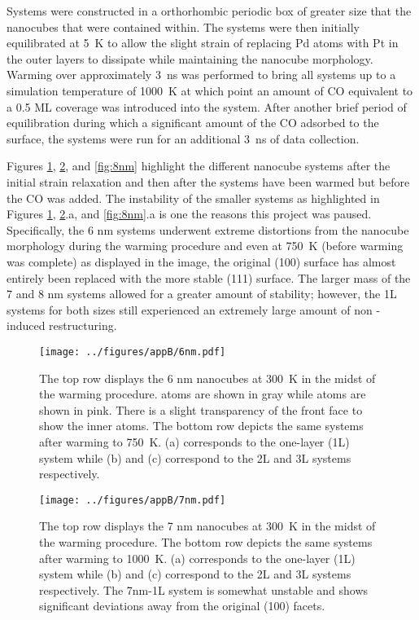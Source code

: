 {Systems were constructed in a orthorhombic periodic box of greater size that
the nanocubes that were contained within. The systems were then initially
equilibrated at 5~K to allow the slight strain of replacing Pd atoms with Pt in
the outer layers to dissipate while maintaining the nanocube morphology.
Warming over approximately 3~ns was performed to bring all systems up to a
simulation temperature of 1000~K at which point an amount of CO equivalent to a
0.5 ML coverage was introduced into the system.  After another brief period of
equilibration during which a significant amount of the CO adsorbed to the
surface, the systems were run for an additional 3~ns of
data collection.

Figures \ref{fig:6nm}, \ref{fig:7nm}, and \ref{fig:8nm} highlight the different
nanocube systems after the initial strain relaxation and then after the systems
have been warmed but before the CO was added. The instability of the smaller
systems as highlighted in Figures \ref{fig:6nm}, \ref{fig:7nm}.a, and
\ref{fig:8nm}.a is one the reasons this project was paused.  Specifically, the
6 nm systems underwent extreme distortions from the nanocube morphology during
the warming procedure and even at 750~K (before warming was complete) as
displayed in the image, the original (100) surface has almost entirely been
replaced with the more stable (111) surface. The larger mass of the 7 and 8 nm
systems allowed for a greater amount of stability; however, the 1L systems for
both sizes still experienced an extremely large amount of non -induced
restructuring.

\begin{landscape}
\begin{figure}[p!]
\centering
  \texttt{[image: ../figures/appB/6nm.pdf]}
  \caption{The top row displays the 6 nm nanocubes at 300~K in the midst of the
warming procedure.   atoms are shown in gray while  atoms are
shown in pink.  There is a slight transparency of the front  face to
show the inner  atoms. The bottom row depicts the same systems after
warming to 750~K.  (a) corresponds to the one-layer (1L) system while (b) and
(c) correspond to the 2L and 3L systems respectively.}
  \label{fig:6nm}
\end{figure}
\end{landscape}

\begin{landscape}
\begin{figure}[p!]
\centering
  \texttt{[image: ../figures/appB/7nm.pdf]}
  \caption{The top row displays the 7 nm nanocubes at 300~K in the midst of the warming procedure.
The bottom row depicts the same systems after warming to
1000~K.  (a) corresponds to the one-layer (1L) system while (b) and (c)
correspond to the 2L and 3L systems respectively. The 7nm-1L system is somewhat
unstable and shows significant deviations away from the original (100) facets.}
  \label{fig:7nm}
\end{figure}
\end{landscape}

}
